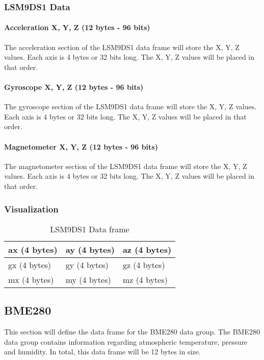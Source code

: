 \documentclass{article}
\begin{document}
  \subsubsection{LSM9DS1 Data}
  \paragraph{Acceleration X, Y, Z (12 bytes - 96 bits)}
  The acceleration section of the LSM9DS1 data frame will store the X, Y, Z values. Each axis is 4 bytes or 32 bits long. The X, Y, Z values will be placed in that order.
  \paragraph{Gyroscope X, Y, Z (12 bytes - 96 bits)}
  The gyroscope section of the LSM9DS1 data frame will store the X, Y, Z values. Each axis is 4 bytes or 32 bits long. The X, Y, Z values will be placed in that order.
  \paragraph{Magnetometer X, Y, Z (12 bytes - 96 bits)}
  The magnetometer section of the LSM9DS1 data frame will store the X, Y, Z values. Each axis is 4 bytes or 32 bits long. The X, Y, Z values will be placed in that order.
  \subsubsection{Visualization}
  
  \begin{table}[h]
  \centering
  \caption{LSM9DS1 Data frame}
  \begin{tabular}{|l|l|l|l|l|l|l|l|l|l|l|l|}
  \hline
  \multicolumn{4}{|l|}{ax (4 bytes)} & \multicolumn{4}{l|}{ay (4 bytes)} & \multicolumn{4}{l|}{az (4 bytes)} \\ \hline
  \multicolumn{4}{|l|}{gx (4 bytes)} & \multicolumn{4}{l|}{gy (4 bytes)} & \multicolumn{4}{l|}{gz (4 bytes)} \\ \hline
  \multicolumn{4}{|l|}{mx (4 bytes)} & \multicolumn{4}{l|}{my (4 bytes)} & \multicolumn{4}{l|}{mz (4 bytes)} \\ \hline
  \end{tabular}
  \end{table}

  \subsection{BME280}
  This section will define the data frame for the BME280 data group. The BME280 data group contains information regarding atmospheric temperature, pressure and humidity. In total, this data frame will be 12 bytes in size.
\end{document}

